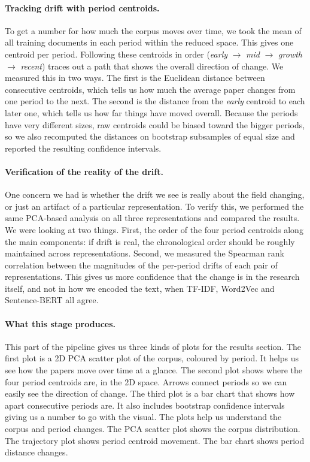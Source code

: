 \documentclass[11pt]{article}
\begin{document}
\paragraph{Tracking drift with period centroids.}
To get a number for how much the corpus moves over time, we took the mean of all training documents in each period within the reduced space. This gives one centroid per period. Following these centroids in order (\textit{early} $\rightarrow$ \textit{mid} $\rightarrow$ \textit{growth} $\rightarrow$ \textit{recent}) traces out a path that shows the overall direction of change. We measured this in two ways. The first is the Euclidean distance between consecutive centroids, which tells us how much the average paper changes from one period to the next. The second is the distance from the \textit{early} centroid to each later one, which tells us how far things have moved overall. Because the periods have very different sizes, raw centroids could be biased toward the bigger periods, so we also recomputed the distances on bootstrap subsamples of equal size and reported the resulting confidence intervals.

\paragraph{Verification of the reality of the drift.}
One concern we had is whether the drift we see is really about the field changing, or just an artifact of a particular representation. To verify this, we performed the same PCA-based analysis on all three representations and compared the results. We were looking at two things. First, the order of the four period centroids along the main components: if drift is real, the chronological order should be roughly maintained across representations. Second, we measured the Spearman rank correlation between the magnitudes of the per-period drifts of each pair of representations. This gives us more confidence that the change is in the research itself, and not in how we encoded the text, when TF-IDF, Word2Vec and Sentence-BERT all agree.

\paragraph{What this stage produces.}

This part of the pipeline gives us three kinds of plots for the results section.
The first plot is a 2D PCA scatter plot of the corpus, coloured by period. It helps us see how the papers move over time at a glance.
The second plot shows where the four period centroids are, in the 2D space. Arrows connect periods so we can easily see the direction of change.
The third plot is a bar chart that shows how apart consecutive periods are. It also includes bootstrap confidence intervals giving us a number to go with the visual.
The plots help us understand the corpus and period changes. The PCA scatter plot shows the corpus distribution. The trajectory plot shows period centroid movement. The bar chart shows period distance changes.
\end{document}
